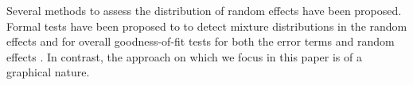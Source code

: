 \documentclass[12pt]{article} %
\newcommand{\hh}[1]{{\color{orange} #1}}
\newcommand{\al}[1]{{\color{red} #1}}
\begin{document}



%
Several methods to assess the distribution of random effects  have been proposed. Formal tests have been proposed to to detect mixture distributions \citep{Verbeke:1996va} in the random effects and for overall goodness-of-fit tests for both the error terms and random effects \citep{Jiang:2001dx}.
\al{In contrast,} \hh{the approach on which we focus in this paper is of a graphical nature.}
\end{document}
